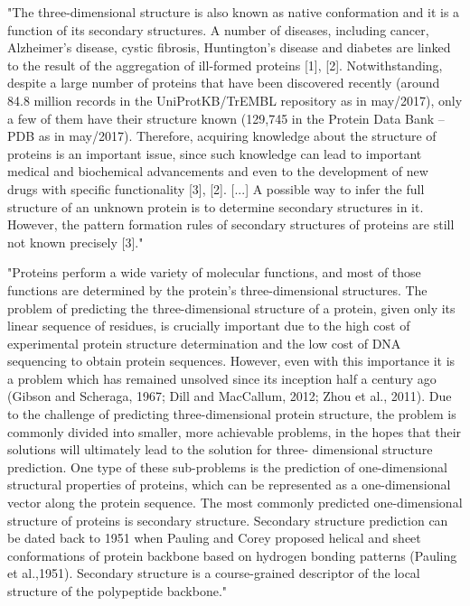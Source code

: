 \documentclass[]{scrartcl}
\begin{document}
"The three-dimensional structure is also known as native conformation and it is a function of its secondary structures. A number of diseases, including cancer, Alzheimer’s disease, cystic fibrosis, Huntington’s disease and diabetes are linked to the result of the aggregation of ill-formed proteins [1], [2]. Notwithstanding, despite a large number of proteins that have been discovered recently (around 84.8 million records in the UniProtKB/TrEMBL repository as in may/2017), only a few of them have their structure known (129,745 in the Protein Data Bank – PDB as in may/2017). Therefore, acquiring knowledge about the structure of proteins is an important issue, since such knowledge can lead to important medical and biochemical advancements and even to the development of new drugs with specific functionality [3], [2]. [...] A possible way to infer the full structure of an unknown protein is to determine secondary structures in it. However, the pattern formation rules of secondary structures of proteins are still not known precisely [3]." \cite{Hattori2017}

"Proteins perform a wide variety of molecular functions, and most of those functions are determined by the protein’s three-dimensional structures. The problem of predicting the three-dimensional structure of a protein, given only its linear sequence of residues, is crucially important due to the high cost of experimental protein structure determination and the low cost of DNA sequencing to obtain protein sequences. However, even with this importance it is a problem which has remained unsolved since its inception half a century ago (Gibson and Scheraga, 1967; Dill and MacCallum, 2012; Zhou et al., 2011). Due to the challenge of predicting three-dimensional protein structure, the problem is commonly divided into smaller, more achievable problems, in the hopes that their solutions will ultimately lead to the solution for three- dimensional structure prediction. One type of these sub-problems is the prediction of one-dimensional structural properties of proteins, which can be represented as a one-dimensional vector along the protein sequence. The most commonly predicted one-dimensional structure of proteins is secondary structure. Secondary structure prediction can be dated back to 1951 when Pauling and Corey proposed helical and sheet conformations of protein backbone based on hydrogen bonding patterns (Pauling et al.,1951). Secondary structure is a course-grained descriptor of the local structure of the polypeptide backbone." \cite{Heffernan2017}
\end{document}
